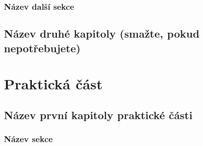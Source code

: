 \documentclass[12pt]{report}
\begin{document}


\section{Název další sekce}


\chapter{Název druhé kapitoly (smažte, pokud nepotřebujete)}


\part{Praktická část}

\chapter{Název první kapitoly praktické části}

\section{Název sekce}



\end{document}
